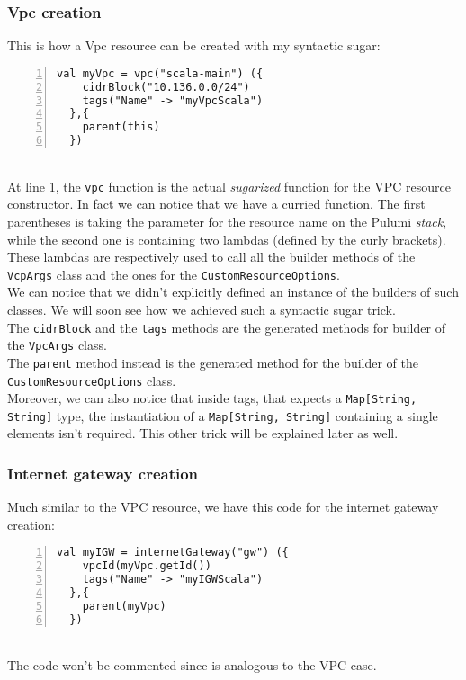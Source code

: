 \subsubsection{Vpc creation}
\label{sssec:vpc-creation-scala}
This is how a Vpc resource can be created with my syntactic sugar:
\begin{lstlisting}[numbers=left, numberstyle=\tiny, numbersep=-5pt, stepnumber=1]
  val myVpc = vpc("scala-main") ({
    cidrBlock("10.136.0.0/24")
    tags("Name" -> "myVpcScala")
  },{
    parent(this)
  })
\end{lstlisting}\mbox{}\\
At line 1, the \texttt{vpc} function is the actual \textit{sugarized} function for the VPC resource constructor.
In fact we can notice that we have a curried function.
The first parentheses is taking the parameter for the resource name on the Pulumi \textit{stack}, while the second one is containing two lambdas (defined by the curly brackets).
These lambdas are respectively used to call all the builder methods of the \texttt{VcpArgs} class and the ones for the \texttt{CustomResourceOptions}.\\
We can notice that we didn't explicitly defined an instance of the builders of such classes.
We will soon see how we achieved such a syntactic sugar trick.\\
The \texttt{cidrBlock} and the \texttt{tags} methods are the generated methods for builder of the \texttt{VpcArgs} class.\\ 
The \texttt{parent} method instead is the generated method for the builder of the \texttt{CustomResourceOptions} class.\\
Moreover, we can also notice that inside tags, that expects a \texttt{Map[String, String]} type, the instantiation of a \texttt{Map[String, String]} containing a single elements isn't required.
This other trick will be explained later as well.

\subsubsection{Internet gateway creation}
Much similar to the VPC resource, we have this code for the internet gateway creation:
\begin{lstlisting}[numbers=left, numberstyle=\tiny, numbersep=-5pt, stepnumber=1]
  val myIGW = internetGateway("gw") ({
    vpcId(myVpc.getId())
    tags("Name" -> "myIGWScala")
  },{
    parent(myVpc)
  })
\end{lstlisting}\mbox{}\\
The code won't be commented since is analogous to the VPC case.

